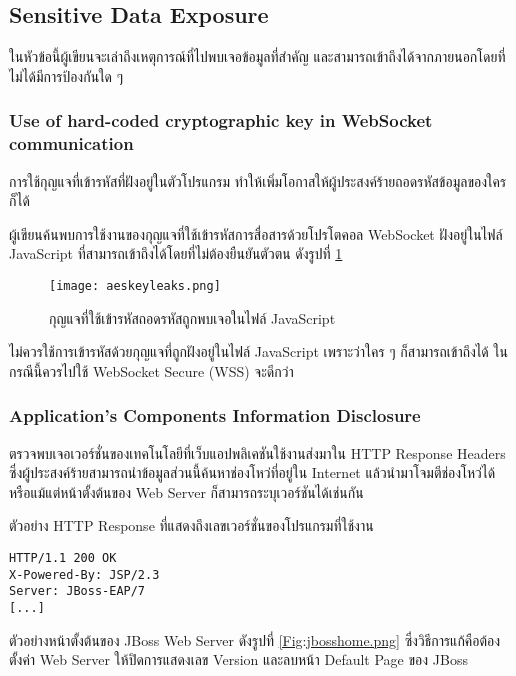 \subsection{Sensitive Data Exposure}

ในหัวข้อนี้ผู้เขียนจะเล่าถึงเหตุการณ์ที่ไปพบเจอข้อมูลที่สำคัญ และสามารถเข้าถึงได้จากภายนอกโดยที่ไม่ได้มีการป้องกันใด ๆ
 
 
\subsubsection{Use of hard-coded cryptographic key in WebSocket communication}

การใช้กุญแจที่เข้ารหัสที่ฝังอยู่ในตัวโปรแกรม ทำให้เพิ่มโอกาสให้ผู้ประสงค์ร้ายถอดรหัสข้อมูลของใครก็ได้

ผู้เขียนค้นพบการใช้งานของกุญแจที่ใช้เข้ารหัสการสื่อสารด้วยโปรโตคอล WebSocket ฝังอยู่ในไฟล์ JavaScript ที่สามารถเข้าถึงได้โดยที่ไม่ต้องยืนยันตัวตน ดังรูปที่ \ref{Fig:aeskeyleaks.png}

 \begin{figure}[h]
	\centering
	\texttt{[image: aeskeyleaks.png]}
	\caption{กุญแจที่ใช้เข้ารหัสถอดรหัสถูกพบเจอในไฟล์ JavaScript}
	\label{Fig:aeskeyleaks.png}
\end{figure}
 
 ไม่ควรใช้การเข้ารหัสด้วยกุญแจที่ถูกฝังอยู่ในไฟล์ JavaScript เพราะว่าใคร ๆ ก็สามารถเข้าถึงได้ ในกรณีนี้ควรไปใช้ WebSocket Secure (WSS) จะดีกว่า
 
 \subsubsection{Application's Components Information Disclosure}
 
 ตรวจพบเจอเวอร์ชั่นของเทคโนโลยีที่เว็บแอปพลิเคชันใช้งานส่งมาใน HTTP Response Headers ซึ่งผู้ประสงค์ร้ายสามารถนำข้อมูลส่วนนี้ค้นหาช่องโหว่ที่อยู่ใน Internet แล้วนำมาโจมตีช่องโหว่ได้ หรือแม้แต่หน้าตั้งต้นของ Web Server ก็สามารถระบุเวอร์ชันได้เช่นกัน
 
 ตัวอย่าง HTTP Response ที่แสดงถึงเลขเวอร์ชั่นของโปรแกรมที่ใช้งาน
 
\begin{lstlisting}[numbers=none] 
HTTP/1.1 200 OK
X-Powered-By: JSP/2.3
Server: JBoss-EAP/7
[...]
\end{lstlisting}
 
ตัวอย่างหน้าตั้งต้นของ JBoss Web Server ดังรูปที่ \ref{Fig:jbosshome.png} ซึ่งวิธีการแก้คือต้องตั้งค่า Web Server ให้ปิดการแสดงเลข Version และลบหน้า Default Page ของ JBoss

